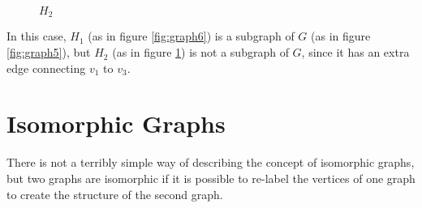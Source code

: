 \begin{minipage}[c]{0.3\linewidth}
  \begin{figure}[H]
    \centering
    \usetikzlibrary{graphs}
    \caption{$H_2$}
    \label{fig:graph7}
  \end{figure}
\end{minipage}

In this case, $H_1$ (as in figure \ref*{fig:graph6}) is a subgraph of $G$ (as in figure \ref*{fig:graph5}), but $H_2$
 (as in figure \ref*{fig:graph7}) is not a subgraph of $G$, since it has an extra edge connecting $v_1$ to $v_3$.

\section*{Isomorphic Graphs}

There is not a terribly simple way of describing the concept of isomorphic graphs, but two graphs are isomorphic if it
 is possible to re-label the vertices of one graph to create the structure of the second graph.

